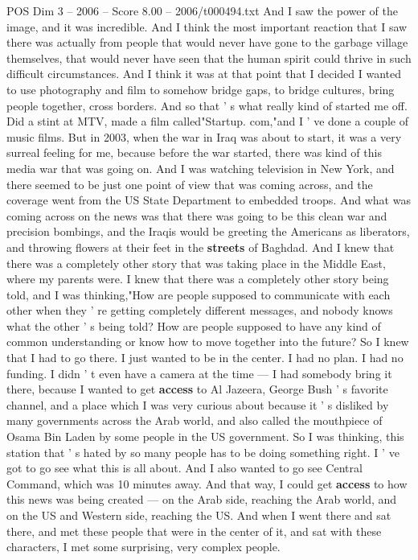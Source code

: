 \begin{textsample}{POS Dim 3 – 2006 – Score 8.00 – 2006/t000494.txt}
And I saw the power of the image, and it was incredible.
And I think the most important reaction that I saw there was actually from people that would never have gone to the garbage village themselves, that would never have seen that the human spirit could thrive in such difficult circumstances.
And I think it was at that point that I decided I wanted to use photography and film to somehow bridge gaps, to bridge cultures, bring people together, cross borders.
And so that ' s what really kind of started me off.
Did a stint at MTV, made a film called"Startup. com,"and I ' ve done a couple of music films.
But in 2003, when the war in Iraq was about to start, it was a very surreal feeling for me, because before the war started, there was kind of this media war that was going on.
And I was watching television in New York, and there seemed to be just one point of view that was coming across, and the coverage went from the US State Department to embedded troops.
And what was coming across on the news was that there was going to be this clean war and precision bombings, and the Iraqis would be greeting the Americans as liberators, and throwing flowers at their feet in the \textbf{streets} of Baghdad.
And I knew that there was a completely other story that was taking place in the Middle East, where my parents were.
I knew that there was a completely other story being told, and I was thinking,"How are people supposed to communicate with each other when they ' re getting completely different messages, and nobody knows what the other ' s being told?
How are people supposed to have any kind of common understanding or know how to move together into the future?
So I knew that I had to go there.
I just wanted to be in the center.
I had no plan.
I had no funding.
I didn ' t even have a camera at the time — I had somebody bring it there, because I wanted to get \textbf{access} to Al Jazeera, George Bush ' s favorite channel, and a place which I was very curious about because it ' s disliked by many governments across the Arab world, and also called the mouthpiece of Osama Bin Laden by some people in the US government.
So I was thinking, this station that ' s hated by so many people has to be doing something right.
I ' ve got to go see what this is all about.
And I also wanted to go see Central Command, which was 10 minutes away.
And that way, I could get \textbf{access} to how this news was being created — on the Arab side, reaching the Arab world, and on the US and Western side, reaching the US.
And when I went there and sat there, and met these people that were in the center of it, and sat with these characters, I met some surprising, very complex people.

\end{textsample}
